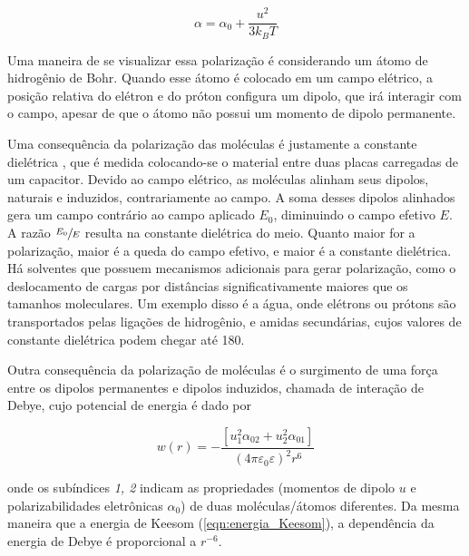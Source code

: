 	\begin{equation}
		\alpha = \alpha _ { 0 } + \dfrac{u ^ { 2 }}{ 3 k_B T }
		\label{eqn:debye_langevin}
	\end{equation} 
	
	Uma maneira de se visualizar essa polarização é considerando um átomo de hidrogênio de Bohr. Quando esse átomo é colocado em um campo elétrico, a posição relativa do elétron e do próton configura um dipolo, que irá interagir com o campo, apesar de que o átomo não possui um momento de dipolo permanente.
	
	Uma consequência da polarização das moléculas é justamente a constante dielétrica , que é medida colocando-se o material entre duas placas carregadas de um capacitor. Devido ao campo elétrico, as moléculas alinham seus dipolos, naturais e induzidos, contrariamente ao campo. A soma desses dipolos alinhados gera um campo contrário ao campo aplicado \(E_0\), diminuindo o campo efetivo \(E\). A razão \(\sfrac{E_0}{E}\) resulta na constante dielétrica do meio. Quanto maior for a polarização, maior é a queda do campo efetivo, e maior é a constante dielétrica. Há solventes que possuem mecanismos adicionais para gerar polarização, como o deslocamento de cargas por distâncias significativamente maiores que os tamanhos moleculares. Um exemplo disso é a água, onde elétrons ou prótons são transportados pelas ligações de hidrogênio,\cite{Israelachvili2011} e amidas secundárias, cujos valores de constante dielétrica podem chegar até 180.\cite{ReichardtSolvents}

	Outra consequência da polarização de moléculas é o surgimento de uma força entre os dipolos permanentes e dipolos induzidos, chamada de interação de Debye, cujo potencial de energia é dado por
	
	\begin{equation}
		w ( r ) = - \frac { \left[ u _ { 1 } ^ { 2 } \alpha _ { 02 } + u _ { 2 } ^ { 2 } \alpha _ { 01 } \right] } { \left( 4 \pi \varepsilon _ { 0 } \varepsilon \right) ^ { 2 } r ^ { 6 } }
		\label{eqn:energia_Debye}
	\end{equation}  
	
	\noindent onde os subíndices \emph{1, 2} indicam as propriedades (momentos de dipolo \(u\) e polarizabilidades eletrônicas \(\alpha_0\)) de duas moléculas/átomos diferentes. Da mesma maneira que a energia de Keesom (\autoref{eqn:energia_Keesom}), a dependência da energia de Debye é proporcional a \(r^{-6}\). 
	
